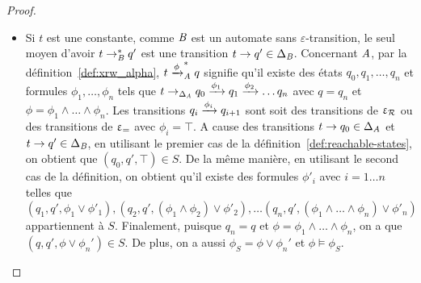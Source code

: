 \begin{proof}
\begin{itemize}
\item Si $t$ est une constante, comme $\mathit B$ est un automate sans $\varepsilon$-transition, le seul
  moyen d'avoir $t \rightarrow^*_\mathit B q'$ est une transition $t \rightarrow q' \in \Delta_\mathit B$. Concernant
  $\mathit A$, par la définition~\ref{def:xrw_alpha}, $t\xrightarrow{\phi}^*_\mathit A q$ signifie
  qu'il existe des états $q_0,q_1, \ldots, q_n$ et formules $\phi_1,\ldots,
  \phi_n$ tels que $t \rightarrow_{\Delta_\mathit A} q_0 \xrightarrow{\phi_1} q_1 \xrightarrow{\phi_2}
  \ldots q_n$ avec $q=q_n$ et $\phi=\phi_1\wedge \ldots \wedge
  \phi_n$. %
  Les transitions $q_i \xrightarrow{\phi_i} q_{i+1}$ sont soit des transitions de $\upvarepsilon_{\mathcal R}$ ou
  des transitions de $\upvarepsilon_{=}$ avec $\phi_i=\top$.  A cause des transitions $t \rightarrow q_0
  \in \Delta_\mathit A$ et $t \rightarrow q' \in \Delta_\mathit B$, en utilisant le premier cas de la
  définition~\ref{def:reachable-states}, on obtient que $(q_0,q',\top) \in
  S$. De la même manière, en utilisant le second cas de la définition, on obtient qu'il existe
  des formules $\phi'_i$ avec $i=1\ldots n$ telles que $(q_1,q', \phi_1\vee
  \phi'_1), (q_2,q',(\phi_1\wedge\phi_2)\vee \phi'_2),\ldots (q_n,q', (\phi_1
  \wedge \ldots \wedge \phi_n)\vee \phi'_n)$ appartiennent à $S$. 
  Finalement, puisque $q_n=q$ et $\phi=\phi_1\wedge \ldots \wedge \phi_n$, on a que
  $(q,q',\phi\vee\phi_n') \in S$. De plus, on a aussi $\phi_S=
  \phi\vee \phi_n'$ et $\phi \models \phi_S$. %


\end{itemize}
\end{proof}
